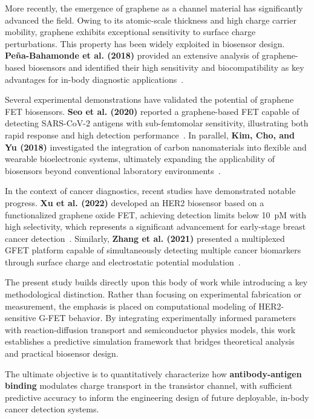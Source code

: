 \documentclass[12pt,a4paper]{report}
\begin{document}
More recently, the emergence of graphene as a channel material has significantly advanced the field. Owing to its atomic-scale thickness and high charge carrier mobility, graphene exhibits exceptional sensitivity to surface charge perturbations. This property has been widely exploited in biosensor design. \textbf{Pe\~na-Bahamonde et al. (2018)} provided an extensive analysis of graphene-based biosensors and identified their high sensitivity and biocompatibility as key advantages for in-body diagnostic applications~\cite{pena2018}.

Several experimental demonstrations have validated the potential of graphene FET biosensors. \textbf{Seo et al. (2020)} reported a graphene-based FET capable of detecting SARS-CoV-2 antigens with sub-femtomolar sensitivity, illustrating both rapid response and high detection performance~\cite{seo2020}. In parallel, \textbf{Kim, Cho, and Yu (2018)} investigated the integration of carbon nanomaterials into flexible and wearable bioelectronic systems, ultimately expanding the applicability of biosensors beyond conventional laboratory environments~\cite{kim2018}.

In the context of cancer diagnostics, recent studies have demonstrated notable progress. \textbf{Xu et al. (2022)} developed an HER2 biosensor based on a functionalized graphene oxide FET, achieving detection limits below 10~pM with high selectivity, which represents a significant advancement for early-stage breast cancer detection~\cite{xu2022}. Similarly, \textbf{Zhang et al. (2021)} presented a multiplexed GFET platform capable of simultaneously detecting multiple cancer biomarkers through surface charge and electrostatic potential modulation~\cite{zhang2021}.

The present study builds directly upon this body of work while introducing a key methodological distinction. Rather than focusing on experimental fabrication or measurement, the emphasis is placed on computational modeling of HER2-sensitive G-FET behavior. By integrating experimentally informed parameters with reaction-diffusion transport and semiconductor physics models, this work establishes a predictive simulation framework that bridges theoretical analysis and practical biosensor design.


The ultimate objective is to quantitatively characterize how \textbf{antibody-antigen binding} modulates charge transport in the transistor channel, with sufficient predictive accuracy to inform the engineering design of future deployable, in-body cancer detection systems.
\end{document}
